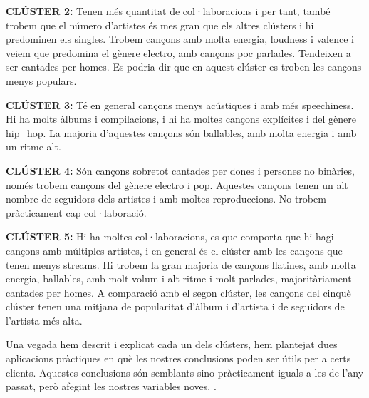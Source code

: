 \documentclass{article}
\begin{document}

\textbf{CLÚSTER 2:} Tenen més quantitat de col·laboracions i per tant, també trobem que el número d'artistes és mes gran que els altres clústers i hi predominen els singles. Trobem cançons amb molta energia, loudness i  valence i veiem que predomina el gènere electro, amb cançons poc parlades. Tendeixen a ser cantades per homes. Es podria dir que en aquest clúster es troben les cançons menys populars.


\textbf{CLÚSTER 3:} Té en general cançons menys acústiques i amb més speechiness. Hi ha molts àlbums i compilacions, i hi ha moltes cançons explícites i del gènere hip\_hop. La majoria d'aquestes cançons són ballables, amb molta energia i amb un ritme alt.


\textbf{CLÚSTER 4:} Són cançons sobretot cantades per dones i persones no binàries, només trobem cançons del gènere electro i pop. Aquestes cançons tenen un alt nombre de seguidors dels artistes i amb moltes reproduccions. No trobem pràcticament cap col·laboració.  


\textbf{CLÚSTER 5:} Hi ha moltes col·laboracions, es que comporta que hi hagi cançons amb múltiples artistes, i en general és el clúster amb les cançons que tenen menys streams. Hi trobem la gran majoria de cançons llatines, amb molta energia, ballables, amb molt volum i alt ritme i molt parlades, majoritàriament cantades per homes. A comparació amb el segon clúster, les cançons del cinquè clúster tenen una mitjana de popularitat d'àlbum i d'artista i de seguidors de l'artista més alta.


Una vegada hem descrit i explicat cada un dels clústers, hem plantejat dues aplicacions pràctiques en què les nostres conclusions poden ser útils per a certs clients. Aquestes conclusions són semblants sino pràcticament iguals a les de l'any passat, però afegint les nostres variables noves. . 
\end{document}
